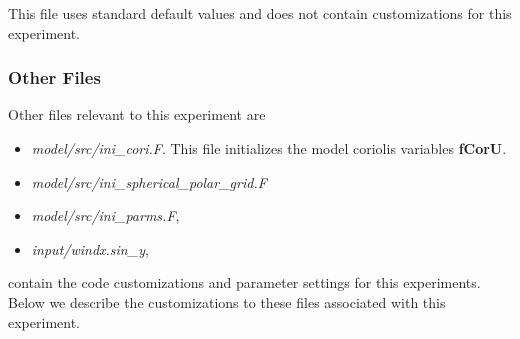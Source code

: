 This file uses standard default values and does not contain
customizations for this experiment.

\subsubsection{Other Files }

Other files relevant to this experiment are
\begin{itemize}
\item {\it model/src/ini\_cori.F}. This file initializes the model
coriolis variables {\bf fCorU}.
\item {\it model/src/ini\_spherical\_polar\_grid.F}
\item {\it model/src/ini\_parms.F},
\item {\it input/windx.sin\_y},
\end{itemize}
contain the code customizations and parameter settings for this 
experiments. Below we describe the customizations
to these files associated with this experiment.

